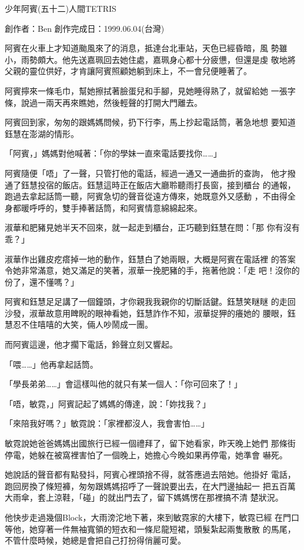 



少年阿賓(五十二)人間TETRIS

創作者：Ben
創作完成日：1999.06.04(台灣)


阿賓在火車上才知道颱風來了的消息，抵達台北車站，天色已經昏暗，風
勢雖小，雨勢頗大。他先送嘉珮回去她住處，嘉珮身心都十分疲憊，但還是虔
敬地將父親的靈位供好，才肯讓阿賓照顧她躺到床上，不一會兒便睡著了。

阿賓擰來一條毛巾，幫她擦拭著臉蛋兒和手腳，見她睡得熟了，就留給她
一張字條，說過一兩天再來瞧她，然後輕聲的打開大門離去。

阿賓回到家，匆匆的跟媽媽問候，扔下行李，馬上抄起電話筒，著急地想
要知道鈺慧在澎湖的情形。

「阿賓，」媽媽對他喊著：「你的學妹一直來電話要找你……」

阿賓隨便「唔」了一聲，只管打他的電話，經過一通又一通曲折的查詢，
他才撥通了鈺慧投宿的飯店。鈺慧這時正在飯店大廳聆聽雨打長窗，接到櫃台
的通報，跑過去拿起話筒一聽，阿賓急切的聲音從遠方傳來，她既意外又感動
，不由得全身都暖呼呼的，雙手捧著話筒，和阿賓情意綿綿起來。

淑華和肥豬見她半天不回來，就一起走到櫃台，正巧聽到鈺慧在問：「那
你有沒有乖？」

淑華作出雞皮疙瘩掉一地的動作，鈺慧白了她兩眼，大概是阿賓在電話裡
的答案令她非常滿意，她又滿足的笑著，淑華一挽肥豬的手，拖著他說：「走
吧！沒你的份了，還不懂嗎？」

阿賓和鈺慧足足講了一個鐘頭，才你親我我親你的切斷話鍵。鈺慧笑瞇瞇
的走回沙發，淑華故意用睥睨的眼神看她，鈺慧詐作不知，淑華捉狎的癢她的
腰眼，鈺慧忍不住嘻嘻的大笑，倆人吵鬧成一團。

而阿賓這邊，他才擱下電話，鈴聲立刻又響起。

「喂……」他再拿起話筒。

「學長弟弟……」會這樣叫他的就只有某一個人：「你可回來了！」

「唔，敏霓，」阿賓記起了媽媽的傳達，說：「妳找我？」

「來陪我好嗎？」敏霓說：「家裡都沒人，我會害怕……」

敏霓說她爸爸媽媽出國旅行已經一個禮拜了，留下她看家，昨天晚上她們
那條街停電，她躲在被窩裡害怕了一個晚上，她擔心今晚如果再停電，她準會
嚇死。

她說話的聲音都有點發抖，阿賓心裡頭捨不得，就答應過去陪她。他掛好
電話，跑回房換了條短褲，匆匆跟媽媽招呼了一聲說要出去，在大門邊抽起一
把五百萬大雨傘，套上涼鞋，「碰」的就出門去了，留下媽媽愣在那裡搞不清
楚狀況。

他快步走過幾個Block，大雨滂沱地下著，來到敏霓家的大樓下，敏霓已經
在門口等他，她穿著一件無袖寬領的短衣和一條尼龍短裙，頭髮紮起兩隻散散
的馬尾，不管什麼時候，她總是會把自己打扮得俏麗可愛。


